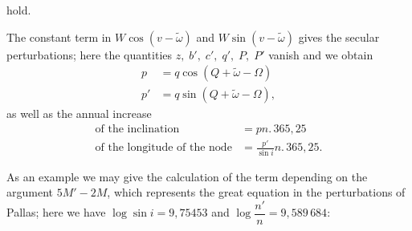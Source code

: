 \noindent hold.
\par\noindent\hspace*{\parindent}The constant term in \(W\cos(v-\tilde\omega)\) and \(W\sin(v-\tilde\omega)\) gives the secular perturbations; here the quantities \(z,\;b',\;c',\;q',\;P,\;P'\) vanish and we obtain
\[
\begin{aligned}
p&=q\cos(Q+\tilde\omega-\Omega)\\
p'&=q\sin(Q+\tilde\omega-\Omega),
\end{aligned}
\]
\noindent as well as the annual increase
\[
\begin{aligned}
\text{of the inclination}&=pn\mathord{.}\,365{,}25\\
\text{of the longitude of the node}&=\frac{p'}{\sin i}n\mathord{.}\,365{,}25.
\end{aligned}
\]
\par\noindent\hspace*{\parindent}As an example we may give the calculation of the term depending on the argument \(5M'-2M\), which represents the great equation in the perturbations of Pallas; here we have \(\log\sin i=9{,}75453\) and \(\log\dfrac{n'}{n}=9{,}589\,684\):
\begingroup
\newcommand{\VSevenLogPoint}{\mathord{.}\mkern3mu}
\newcommand{\VSevenLogFive}{\VSevenLogPoint\VSevenLogPoint\VSevenLogPoint\VSevenLogPoint\VSevenLogPoint}
